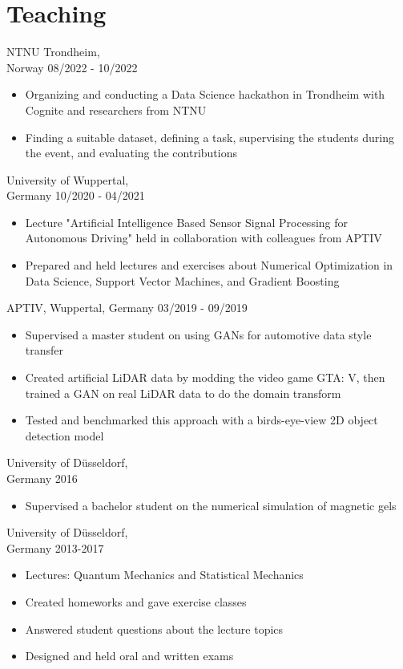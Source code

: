 \documentclass[singlesided,
               paper=a4,
               fontsize=10pt
              ]{my-resume}
\begin{document}
\section[\faBook]{Teaching}
	{NTNU Trondheim,\\ Norway}
	{08/2022 - 10/2022}
    {\begin{itemize}[leftmargin=2em]
		\item Organizing and conducting a Data Science hackathon in Trondheim with Cognite and researchers from NTNU
		\item Finding a suitable dataset, defining a task, supervising the students during the event, and evaluating the contributions
	\end{itemize}}

    {University of Wuppertal,\\ Germany}
    {10/2020 - 04/2021}
    {\begin{itemize}[leftmargin=2em]
        \item Lecture "Artificial Intelligence Based Sensor Signal Processing for Autonomous Driving" held in collaboration with colleagues from APTIV
        \item Prepared and held lectures and exercises about Numerical Optimization in Data Science, Support Vector Machines, and Gradient Boosting
    \end{itemize}}
%
    {APTIV, Wuppertal, Germany}
    {03/2019 - 09/2019}
    {\begin{itemize}[leftmargin=2em]
        \item Supervised a master student on using GANs for automotive data style transfer
        \item Created artificial LiDAR data by modding the video game GTA: V, then trained a GAN on real LiDAR data to do the domain transform
        \item Tested and benchmarked this approach with a birds-eye-view 2D object detection model
    \end{itemize}}
%
    {University of Düsseldorf, \\ Germany}
    {2016}
    {\begin{itemize}[leftmargin=2em]
        \item Supervised a bachelor student on the numerical simulation of magnetic gels 
    \end{itemize}}
%
    {University of Düsseldorf, \\ Germany}
    {2013-2017}
    {\begin{itemize}[leftmargin=2em]
        \item Lectures: Quantum Mechanics and Statistical Mechanics
        \item Created homeworks and gave exercise classes
        \item Answered student questions about the lecture topics
        \item Designed and held oral and written exams
    \end{itemize}}
\end{document}
